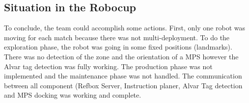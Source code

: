 \subsection{Situation in the Robocup}

To conclude, the team could accomplish some actions. First, only one robot was moving for each match because there was not multi-deployment. To do the exploration phase, the robot was going in some fixed positions (landmarks). There was no detection of the zone and the orientation of a MPS however the Alvar tag detection was fully working. The production phase was not implemented and the maintenance phase was not handled. The communication between all component (Refbox Server, Instruction planer, Alvar Tag detection and MPS docking was working and complete. 